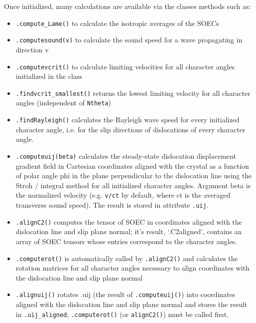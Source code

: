 \documentclass[11pt,letterpaper,oneside,pdftex]{article}
\begin{document}
Once initialized, many calculations are available via the classes methods such as:
\begin{itemize}
\item \verb|.compute_Lame()| to calculate the isotropic averages of the SOECs

\item \verb|.computesound(v)| to calculate the sound speed for a wave propagating in direction v

\item \verb|.computevcrit()| to calculate limiting velocities for all character angles initialized in the class

\item \verb|.findvcrit_smallest()| returns the lowest limiting velocity for all character angles (independent of \verb|Ntheta|)

\item \verb|.findRayleigh()| calculates the Rayleigh wave speed for every initialized character angle, i.e. for the slip directions of dislocations of every character angle.

\item \verb|.computeuij(beta)| calculates the steady-state dislocation displacement gradient field in Cartesian coordinates aligned with the crystal as a function of polar angle phi in the plane perpendicular to the dislocation line using the Stroh / integral method \cite{Bacon:1980} for all initialized character angles.
Argument beta is the normalized velocity (e.g. \verb|v/ct| by default, where ct is the averaged transverse sound speed).
The result is stored in attribute \verb|.uij|.
\item \verb|.alignC2()| computes the tensor of SOEC in coordinates aligned with the dislocation line and slip plane normal; it’s result, ‘.C2aligned’, contains an array of SOEC tensors whose entries correspond to the character angles.

\item \verb|.computerot()| is automatically called by \verb|.alignC2()| and calculates the rotation matrices for all character angles necessary to align coordinates with the dislocation line and slip plane normal

\item \verb|.alignuij()| rotates .uij (the result of \verb|.computeuij()|) into coordinates aligned with the dislocation line and slip plane normal and stores the result in \verb|.uij_aligned|; \verb|.computerot()| (or \verb|alignC2()|) must be called first.


\end{itemize}
\end{document}
